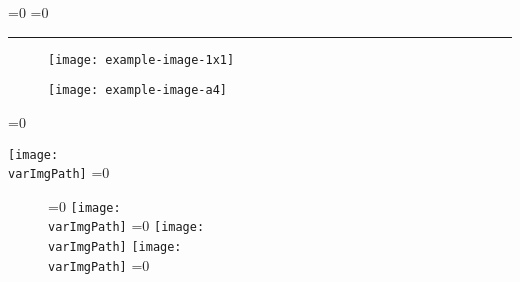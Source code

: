 
\captionsetup[figure]{	
	font=\varFigCapLabelSize,
}
\ifnum{}=0
\captionsetup[figure]{
		labelformat=empty,
}
\fi
\ifnum{}=0
\captionsetup[figure]{
		labelformat=empty,
}
\fi

\hrule%

\begin{figure}
\texttt{[image: example-image-1x1]}
\end{figure}
\begin{figure}
\texttt{[image: example-image-a4]}
\end{figure}


\ifnum{}=0 
	\begin{wrapfigure}{\varFigFloat}{\varFigWidth\textwidth}
		\vspace{-12pt} %
		\texttt{[image: \\varImgPath]} 
		\ifnum\pdfstrcmp{\varCaption	}{}=0 \else \caption{\varCaption} \fi 
	\end{wrapfigure}
\else
	\begin{figure}[\varFigPlacement]
	\centering
	\ifnum{}=0 
		\texttt{[image: \\varImgPath]}
	\else
		\ifnum{}=0 
			\texttt{[image: \\varImgPath]}			
		\else
			\texttt{[image: \\varImgPath]}
		\fi 
	\fi 
	\ifnum\pdfstrcmp{\varCaption}{}=0 \else \caption{\varCaption} \fi 
	\end{figure}
\fi 